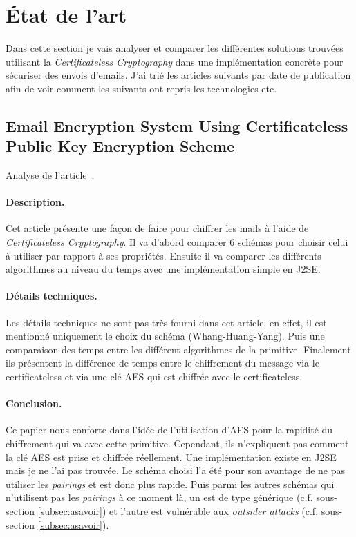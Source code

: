 \section{État de l'art}
Dans cette section je vais analyser et comparer les différentes solutions trouvées utilisant la \textit{Certificateless Cryptography} dans une implémentation concrète pour sécuriser des envois d'emails. J'ai trié les articles suivants par date de publication afin de voir comment les suivants ont repris les technologies etc.
\subsection{Email Encryption System Using Certificateless Public Key Encryption Scheme}
Analyse de l'article~\cite{DBLP:conf/itcs2/ErYTG12}.
\paragraph*{Description.} Cet article présente une façon de faire pour chiffrer les mails à l'aide de \textit{Certificateless Cryptography}. Il va d'abord comparer 6 schémas pour choisir celui à utiliser par rapport à ses propriétés. Ensuite il va comparer les différents algorithmes au niveau du temps avec une implémentation simple en J2SE. 
\paragraph*{Détails techniques.} Les détails techniques ne sont pas très fourni dans cet article, en effet, il est mentionné uniquement le choix du schéma (Whang-Huang-Yang). Puis une comparaison des temps entre les différent algorithmes de la primitive. Finalement ils présentent la différence de temps entre le chiffrement du message via le certificateless et via une clé AES qui est chiffrée avec le certificateless.
\paragraph*{Conclusion.} Ce papier nous conforte dans l'idée de l'utilisation d'AES pour la rapidité du chiffrement qui va avec cette primitive. Cependant, ils n'expliquent pas comment la clé AES est prise et chiffrée réellement. Une implémentation existe en J2SE mais je ne l'ai pas trouvée. Le schéma choisi l'a été pour son avantage de ne pas utiliser les \textit{pairings} et est donc plus rapide. Puis parmi les autres schémas qui n'utilisent pas les \textit{pairings} à ce moment là, un est de type générique (c.f. sous-section \ref{subsec:asavoir}) et l'autre est vulnérable aux \textit{outsider attacks} (c.f. sous-section \ref{subsec:asavoir}).
